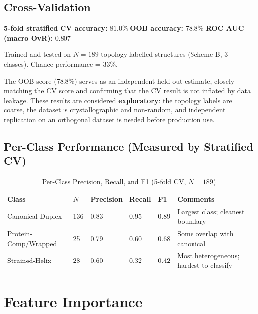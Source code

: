 \subsection{Cross-Validation}

\begin{keyresult}
    \textbf{5-fold stratified CV accuracy:} $\mathbf{81.0\%}$ \quad
    \textbf{OOB accuracy:} $\mathbf{78.8\%}$ \quad
    \textbf{ROC AUC (macro OvR):} $\mathbf{0.807}$

    Trained and tested on $N = 189$ topology-labelled structures (Scheme B, 3 classes). Chance performance = 33\%.
\end{keyresult}

The OOB score ($78.8\%$) serves as an independent held-out estimate, closely matching the CV score and confirming that the CV result is not inflated by data leakage. These results are considered \textbf{exploratory}: the topology labels are coarse, the dataset is crystallographic and non-random, and independent replication on an orthogonal dataset is needed before production use.

\subsection{Per-Class Performance (Measured by Stratified CV)}

\begin{table}[h]
    \centering
    \caption{Per-Class Precision, Recall, and F1 (5-fold CV, $N=189$)}
    \begin{tabular}{llllll}
        \toprule
        \textbf{Class} & $N$ & \textbf{Precision} & \textbf{Recall} & \textbf{F1} & \textbf{Comments} \\
        \midrule
        Canonical-Duplex     & 136 & 0.83 & 0.95 & 0.89 & Largest class; cleanest boundary \\
        Protein-Comp/Wrapped &  25 & 0.79 & 0.60 & 0.68 & Some overlap with canonical \\
        Strained-Helix       &  28 & 0.60 & 0.32 & 0.42 & Most heterogeneous; hardest to classify \\
        \bottomrule
    \end{tabular}
\end{table}

\section{Feature Importance}

